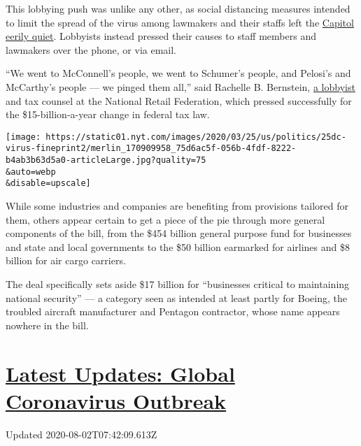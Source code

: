 This lobbying push was unlike any other, as social distancing measures
intended to limit the spread of the virus among lawmakers and their
staffs left the
\href{https://www.nytimes.com/2020/03/19/us/politics/coronavirus-congress-voting.html}{Capitol
eerily quiet}. Lobbyists instead pressed their causes to staff members
and lawmakers over the phone, or via email.

``We went to McConnell's people, we went to Schumer's people, and
Pelosi's and McCarthy's people --- we pinged them all,'' said Rachelle
B. Bernstein,
\href{https://www.opensecrets.org/federal-lobbying/firms/lobbyists?cycle=2019\&id=D000000741}{a
lobbyist} and tax counsel at the National Retail Federation, which
pressed successfully for the \$15-billion-a-year change in federal tax
law.

\texttt{[image: https://static01.nyt.com/images/2020/03/25/us/politics/25dc-virus-fineprint2/merlin\_170909958\_75d6ac5f-056b-4fdf-8222-b4ab3b63d5a0-articleLarge.jpg?quality=75\\\&auto=webp\\\&disable=upscale]}

While some industries and companies are benefiting from provisions
tailored for them, others appear certain to get a piece of the pie
through more general components of the bill, from the \$454 billion
general purpose fund for businesses and state and local governments to
the \$50 billion earmarked for airlines and \$8 billion for air cargo
carriers.

The deal specifically sets aside \$17 billion for ``businesses critical
to maintaining national security'' --- a category seen as intended at
least partly for Boeing, the troubled aircraft manufacturer and Pentagon
contractor, whose name appears nowhere in the bill.

\hypertarget{latest-updates-global-coronavirus-outbreak}{%
\section{\texorpdfstring{\href{https://www.nytimes.com/2020/08/01/world/coronavirus-covid-19.html?action=click\&pgtype=Article\&state=default\&region=MAIN_CONTENT_1\&context=storylines_live_updates}{Latest
Updates: Global Coronavirus
Outbreak}}{Latest Updates: Global Coronavirus Outbreak}}\label{latest-updates-global-coronavirus-outbreak}}

Updated 2020-08-02T07:42:09.613Z

